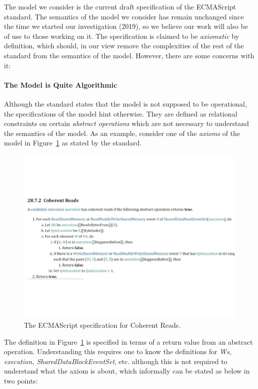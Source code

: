 
The model we consider is the current draft specification \cite{ECMA} of the ECMAScript standard. 
The semantics of the model we consider has remain unchanged since the time we started our investigation (2019), so we believe our work will also be of use to those working on it. 
The specification is claimed to be \textit{axiomatic} by definition, which should, in our view remove the complexities of the rest of the standard from the semantics of the model.
However, there are some concerns with it: 

\paragraph{The Model is Quite Algorithmic}
    Although the standard states that the model is not supposed to be operational, the specifications of the model hint otherwise. 
    They are defined as relational constraints on certain \textit{abstract operations} which are not necessary to understand the semantics of the model.  
    As an example, consider one of the \textit{axioms} of the model in Figure~\ref{model:Std1} as stated by the standard. 
    \begin{figure}[H]
        \centering 
        \includegraphics[scale=0.6]{3.ECMAScriptMemoryModel/ECMAScriptStdCoherentReads.pdf}
        \caption{The ECMAScript specification for Coherent Reads.}
        \label{model:Std1}
    \end{figure}
    The definition in Figure~\ref{model:Std1} is specified in terms of a return value from an abstract operation. 
    Understanding this requires one to know the definitions for \textit{Ws, execution, SharedDataBlockEventSet}, etc. although this is not required to understand what the axiom is about, which informally can be stated as below in two points:
